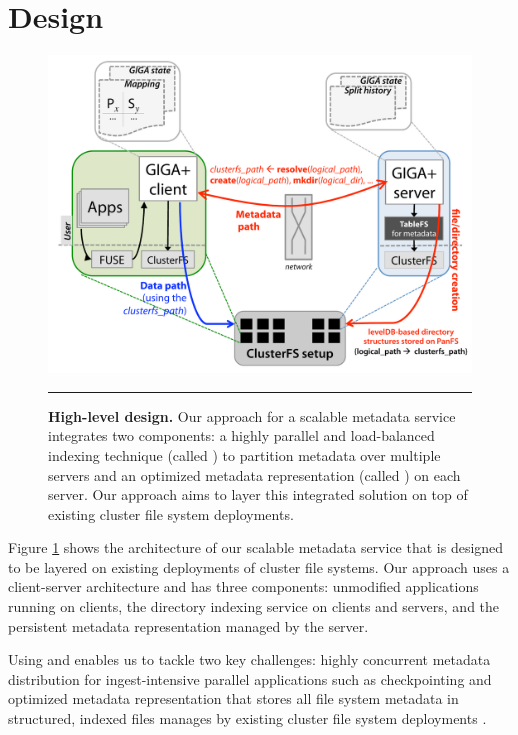 \section{Design}

\begin{figure}[t]   %
\centerline{\includegraphics[scale=0.3]{./figs/giga-impl-leveldb-clusterfs}}
\caption{
\textbf{High-level design.}
{\small
Our approach for a scalable metadata service integrates two components: a highly 
parallel and load-balanced indexing technique (called \giga{} \cite{GIGA}) to 
partition
metadata over multiple servers and an optimized metadata representation (called
\tfs{} \cite{tablefs}) on each server. 
Our approach aims to layer this integrated solution on top of existing cluster file 
system deployments. 
}
}
\vspace{15pt}
\hrule
\label{fig:design}
\end{figure}       %

Figure \ref{fig:design} shows the architecture of our scalable metadata
service that is designed to be layered on existing deployments of cluster file
systems. Our approach uses a client-server architecture and has three components: 
unmodified applications running on clients, the \giga{} directory indexing service 
on clients and servers, and the \tfs{} persistent metadata representation managed 
by the server. 

Using \giga{} and \tfs{} enables us to tackle two key challenges: highly 
concurrent metadata distribution for ingest-intensive parallel applications
such as checkpointing \cite{GIGA} and 
optimized metadata representation that stores all file system
metadata in structured, indexed files manages by existing cluster file system
deployments \cite{tablefs}. 

